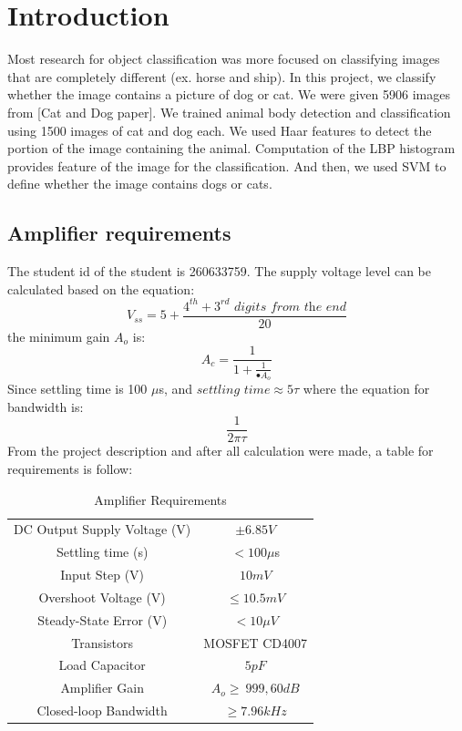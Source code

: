 \documentclass[conference,compsoc]{IEEEtran}
\begin{document}
\section{Introduction}
Most research for object classification was more focused on classifying images that are completely different (ex. horse and ship). In this project, we classify whether the image contains a picture of dog or cat. We were given 5906 images from [Cat and Dog paper]. We trained animal body detection and classification using 1500 images of cat and dog each. We used Haar features to detect the portion of the image containing the animal. Computation of the LBP histogram provides feature of the image for the classification. And then, we used  SVM to define whether the image contains dogs or cats.

\subsection{Amplifier requirements}
The student id of the student is 260633759. The supply voltage level can be calculated based on the equation:\\
\[
V_{ss} = 5 + \frac{4^{th} + 3^{rd} \textit{ digits from the end} }{20}
\]
the minimum gain \(A_o\) is:\\
\[
A_c = \frac{1}{1 + \frac{1}{•A_o}}
\]
Since settling time is 100 \(\mu \)s, and \(\textit{settling time} \approx 5\tau\) where the equation for bandwidth is:\\
\[
\frac{1}{2\pi\tau}
\]
From the project description and after all calculation were made, a table for requirements is follow:\\
\begin{table}[!hbt]
	\centering
	\begin{tabular}{|c|c|}
	\hline
	DC Output Supply Voltage (V) & \(\pm 6.85V\)\\
	Settling time (s) & \(< 100 \mu \)s \\
	Input Step (V) & \(10 mV\)\\
	Overshoot Voltage (V) & \(\leq 10.5 mV\)\\
	Steady-State Error (V) & \(<10 \mu V\)\\
	Transistors & MOSFET CD4007\\
	Load Capacitor & \(5 pF\)\\
	Amplifier Gain & \(A_o \geq\ 999, 60 dB\)\\
	Closed-loop Bandwidth & \(\geq 7.96 kHz\)\\
	\hline
	\end{tabular}
	\caption{Amplifier Requirements}\label{table: 1}
\end{table}
\end{document}
